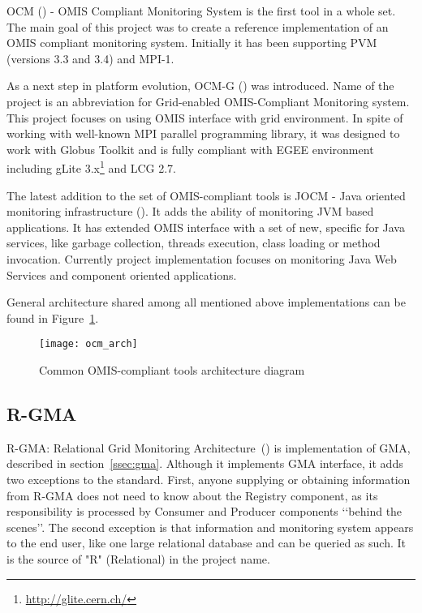 OCM (\cite{RWspdt98, RW:ppam99b}) - OMIS Compliant Monitoring System is the first tool in a whole set. The main goal of this project was to create a reference implementation of an OMIS compliant monitoring system. Initially it has been supporting PVM (versions 3.3 and 3.4) and MPI-1.

As a next step in platform evolution, OCM-G (\cite{axgrid03b}) was introduced. Name of the project is an abbreviation for Grid-enabled OMIS-Compliant Monitoring system. This project focuses on using OMIS interface with grid environment. In spite of working with well-known MPI parallel programming library, it was designed to work with Globus Toolkit and is fully compliant with EGEE environment including gLite 3.x\footnote{\url{http://glite.cern.ch/}} and LCG 2.7.

The latest addition to the set of OMIS-compliant tools is JOCM - Java oriented monitoring infrastructure (\cite{jocm}). It adds the ability of monitoring JVM based applications. It has extended OMIS interface with a set of new, specific for Java services, like garbage collection, threads execution, class loading or method invocation. Currently project implementation focuses on monitoring Java Web Services and component oriented applications.

General architecture shared among all mentioned above implementations can be found in Figure~\ref{fig:ocmg}.

\begin{figure}[ht]

\centering

\texttt{[image: ocm\_arch]} \caption{Common OMIS-compliant tools architecture diagram} \label{fig:ocmg}

\end{figure}


\subsection{R-GMA}

R-GMA: Relational Grid Monitoring Architecture~(\cite{RGMA1,RGMA2,RGMA3}) is implementation of GMA, described in section~\ref{ssec:gma}. Although it implements GMA interface, it adds two exceptions to the standard. First, anyone supplying or obtaining information from R-GMA does not need to know about the Registry component, as its responsibility is processed by Consumer and Producer components \lq\lq{}behind the scenes\rq\rq{}. The second exception is that information and monitoring system appears to the end user, like one large relational database and can be queried as such. It is the source of "R" (Relational) in the project name.

